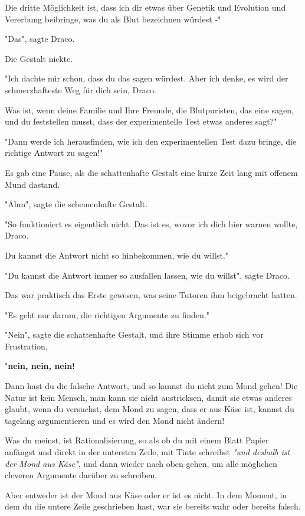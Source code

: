 {Die dritte Möglichkeit ist, dass ich dir etwas über Genetik und Evolution und Vererbung beibringe, was du als Blut bezeichnen würdest -"

"Das", sagte Draco.

Die Gestalt nickte.

"Ich dachte mir schon, dass du das sagen würdest. Aber ich denke, es wird der schmerzhafteste Weg für dich sein, Draco.

Was ist, wenn deine Familie und Ihre Freunde, die Blutpuristen, das eine sagen, und du feststellen musst, dass der experimentelle Test etwas anderes sagt?"

"Dann werde ich herausfinden, wie ich den experimentellen Test dazu bringe, die richtige Antwort zu sagen!"

Es gab eine Pause, als die schattenhafte Gestalt eine kurze Zeit lang mit offenem Mund dastand.

"Ähm", sagte die schemenhafte Gestalt.

"So funktioniert es eigentlich nicht. Das ist es, wovor ich dich hier warnen wollte, Draco.

Du kannst die Antwort nicht so hinbekommen, wie du willst."

"Du kannst die Antwort immer so ausfallen lassen, wie du willst", sagte Draco.

Das war praktisch das Erste gewesen, was seine Tutoren ihm beigebracht hatten.

"Es geht nur darum, die richtigen Argumente zu finden."

"Nein", sagte die schattenhafte Gestalt, und ihre Stimme erhob sich vor Frustration,

"\textbf{nein, nein, nein!}

Dann hast du die falsche Antwort, und so kannst du nicht zum Mond gehen! Die Natur ist kein Mensch, man kann sie nicht austricksen, damit sie etwas anderes glaubt, wenn du versuchst, dem Mond zu sagen, dass er aus Käse ist, kannst du tagelang argumentieren und es wird den Mond nicht ändern!

Was du meinst, ist Rationalisierung, so als ob du mit einem Blatt Papier anfängst und direkt in der untersten Zeile, mit Tinte schreibst \emph{"und deshalb ist der Mond aus Käse"}, und dann wieder nach oben gehen, um alle möglichen cleveren Argumente darüber zu schreiben.

Aber entweder ist der Mond aus Käse oder er ist es nicht. In dem Moment, in dem du die untere Zeile geschrieben hast, war sie bereits wahr oder bereits falsch.

}
